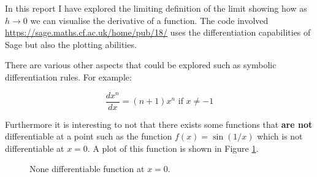 \documentclass[a4paper]{article}
\begin{document}
In this report I have explored the limiting definition of the limit showing how as $h\to 0$ we can visualise the derivative of a function. The code involved \url{https://sage.maths.cf.ac.uk/home/pub/18/} uses the differentiation capabilities of Sage but also the plotting abilities.

There are various other aspects that could be explored such as symbolic differentiation rules. For example:

$$\frac{dx^n}{dx}=(n+1)x^{n}\text{ if }x\ne-1$$

Furthermore it is interesting to not that there exists some functions that \textbf{are not} differentiable at a point such as the function $f(x)=\sin(1/x)$ which is not differentiable at $x=0$. A plot of this function is shown in Figure \ref{notdiff}.

\begin{figure}[!htbp]
\begin{center}

\end{center}
\caption{None differentiable function at $x=0$.}\label{notdiff}
\end{figure}




\end{document}
